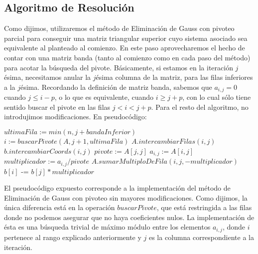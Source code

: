 \subsection{Algoritmo de Resolución}
Como dijimos, utilizaremos el método de Eliminación de Gauss con pivoteo parcial para conseguir una matriz triangular superior cuyo sistema asociado sea equivalente al planteado al comienzo. En este paso aprovecharemos el hecho de contar con una matriz banda (tanto al comienzo como en cada paso del método) para acotar la búsqueda del pivote. Básicamente, si estamos en la iteración $j$ésima, necesitamos anular la $j$ésima columna de la matriz, para las filas inferiores a la $j$ésima. Recordando la definición de matriz banda, sabemos que $a_{i,j} = 0$ cuando $j \leq i-p$, o lo que es equivalente, cuando $i \geq j+p$, con lo cual sólo tiene sentido buscar el pivote en las filas $j < i < j+p$. Para el resto del algoritmo, no introdujimos modificaciones. En pseudocódigo:
 \begin{algorithm}
\caption{$triangular(A, b, bandaInferior)$}
\begin{algorithmic}
	\State $ultimaFila := min(n, j+bandaInferior)$
    \State $i := buscarPivote(A, j+1, ultimaFila)$
            \State $A.intercambiarFilas(i, j)$
			\State $b.intercambiarCoords(i,j)$
        \EndIf
     \State $pivote := A[j, j]$
        \State $a_{i,j} := A[i,j]$ %
	            \State $multiplicador := a_{i,j} / pivote$
	            \State $A.sumarMultiploDeFila(i, j, -multiplicador)$
	            \State $b[i]$ -= $b[j]*multiplicador$
	     \EndIf
      \EndFor
\EndFor
\end{algorithmic}
\end{algorithm}

El pseudocódigo expuesto corresponde a la implementación del método de Eliminación de Gauss con pivoteo sin mayores modificaciones. Como dijimos, la única diferencia está en la operación $buscarPivote$, que está restringida a las filas donde no podemos asegurar que no haya coeficientes nulos. La implementación de ésta es una búsqueda trivial de máximo módulo entre los elementos $a_{i,j}$, donde $i$ pertenece al rango explicado anteriormente y $j$ es la columna correspondiente a la iteración.
 
